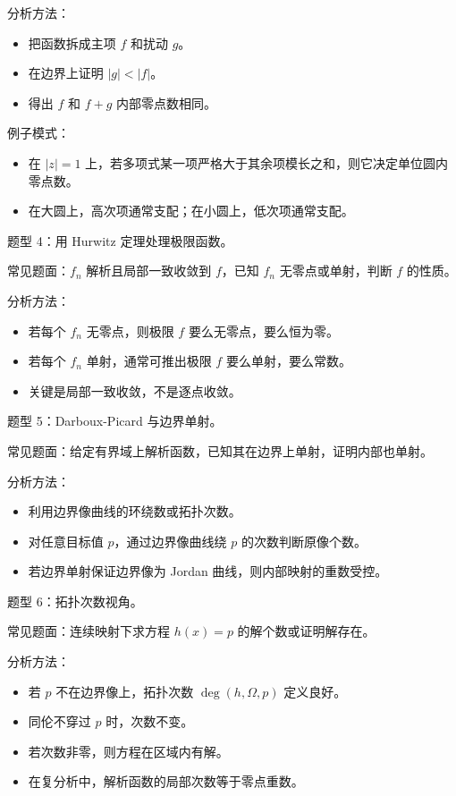 \documentclass{article}
\begin{document}
分析方法：

\begin{itemize}
\item
  把函数拆成主项 $f$ 和扰动 $g$。
\item
  在边界上证明
  \(|g|<|f|\)。
\item
  得出 $f$ 和 $f+g$ 内部零点数相同。
\end{itemize}

例子模式：

\begin{itemize}
\item
  在 $|z|=1$
  上，若多项式某一项严格大于其余项模长之和，则它决定单位圆内零点数。
\item
  在大圆上，高次项通常支配；在小圆上，低次项通常支配。
\end{itemize}

题型 4：用 Hurwitz 定理处理极限函数。

常见题面：$f_n$ 解析且局部一致收敛到 $f$，已知
$f_n$ 无零点或单射，判断 $f$ 的性质。

分析方法：

\begin{itemize}
\item
  若每个 $f_n$ 无零点，则极限 $f$
  要么无零点，要么恒为零。
\item
  若每个 $f_n$ 单射，通常可推出极限 $f$
  要么单射，要么常数。
\item
  关键是局部一致收敛，不是逐点收敛。
\end{itemize}

题型 5：Darboux-Picard 与边界单射。

常见题面：给定有界域上解析函数，已知其在边界上单射，证明内部也单射。

分析方法：

\begin{itemize}
\item
  利用边界像曲线的环绕数或拓扑次数。
\item
  对任意目标值 $p$，通过边界像曲线绕 $p$
  的次数判断原像个数。
\item
  若边界单射保证边界像为 Jordan 曲线，则内部映射的重数受控。
\end{itemize}

题型 6：拓扑次数视角。

常见题面：连续映射下求方程 $h(x)=p$ 的解个数或证明解存在。

分析方法：

\begin{itemize}
\item
  若 $p$ 不在边界像上，拓扑次数 $\deg(h,\Omega,p)$
  定义良好。
\item
  同伦不穿过 $p$ 时，次数不变。
\item
  若次数非零，则方程在区域内有解。
\item
  在复分析中，解析函数的局部次数等于零点重数。
\end{itemize}
\end{document}
